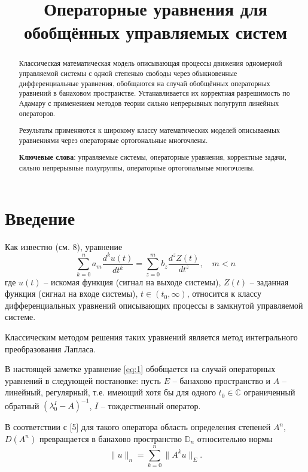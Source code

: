 \documentclass[14pt,a4paper]{article}
\title{Операторные уравнения для обобщённых управляемых систем}
\theoremstyle{plain}
\numberwithin{equation}{section}
\begin{document}
\begin{abstract}
    Классическая математическая модель описывающая процессы движения одномерной управляемой системы с одной
    степенью свободы через обыкновенные дифференциальные уравнения, обобщаются на случай обобщённых операторных
    уравнений в банаховом пространстве. Устанавливается их корректная разрешимость по Адамару с применением
    методов теории сильно непрерывных полугрупп линейных операторов.

    Результаты применяются к широкому классу математических моделей описываемых уравнениями через
    операторные ортогональные многочлены.

    \textbf{Ключевые слова}: управляемые системы, операторные уравнения, корректные задачи,
    сильно непрерывные полугруппы, операторные ортогональные многочлены.
\end{abstract}

\maketitle
\tableofcontents

\section{Введение}

Как известно (см. 8), уравнение
\begin{equation}
    \label{eq:1}
    \sum_{k=0}^{n} a_m \frac{d^k u(t)}{dt^k} = \sum_{z=0}^{m} b_z \frac{d^z Z(t)}{dt^z}, \quad m < n
\end{equation}
где $u(t)$ -- искомая функция (сигнал на выходе системы), $Z(t)$ -- заданная функция (сигнал на входе системы),
$t \in (t_0, \infty)$, относится к классу дифференциальных уравнений описывающих процессы в замкнутой
управляемой системе.

Классическим методом решения таких уравнений является метод интегрального преобразования Лапласа.

В настоящей заметке уравнение \ref{eq:1} обобщается на случай операторных уравнений в следующей постановке:
пусть $E$ -- банахово пространство и $A$ -- линейный, регулярный, т.е. имеющий хотя бы для одного $t_0 \in \mathbb{C}$
ограниченный обратный $(\lambda_0^I - A)^{-1}$, $I$ -- тождественный оператор.

В соответствии с [5] для такого оператора область определения степеней $A^n$, $D(A^n)$ превращается в
банахово пространство $\mathbb{D}_n$ относительно нормы
\begin{equation}
    \|u\|_n = \sum_{k=0}^{n} \|A^k u\|_E.
\end{equation}
\end{document}
